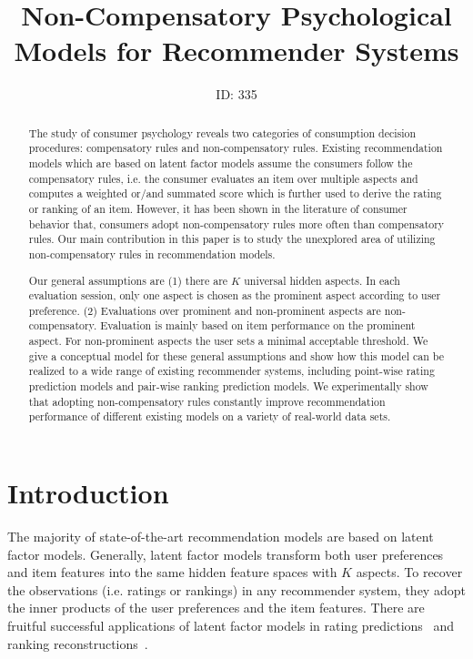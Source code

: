 \documentclass[letterpaper]{article} %
\begin{document}
%
\title{Non-Compensatory Psychological Models for Recommender Systems}
\author{ID: 335
}
\maketitle
\begin{abstract}
The study of consumer psychology reveals two categories of consumption decision procedures: compensatory rules and non-compensatory rules. Existing recommendation models which are based on latent factor models assume the consumers follow the compensatory rules, i.e. the consumer evaluates an item over multiple aspects and computes a weighted or/and summated score which is further used to derive the rating or ranking of an item. However, it has been shown in the literature of consumer behavior that, consumers adopt non-compensatory rules more often than compensatory rules. Our main contribution in this paper is to study the unexplored area of utilizing non-compensatory rules in recommendation models. 

Our general assumptions are (1) there are $K$ universal hidden aspects. In each evaluation session, only one aspect is chosen as the prominent aspect according to user preference. (2) Evaluations over prominent and non-prominent aspects are non-compensatory. Evaluation is mainly based on item performance on the prominent aspect. For non-prominent aspects the user sets a minimal acceptable threshold. We give a conceptual model for these general assumptions and show how this model can be realized to a wide range of existing recommender systems, including  point-wise rating prediction models and pair-wise ranking prediction models.  We experimentally show that adopting non-compensatory rules constantly improve recommendation performance of different existing models on a variety of real-world data sets.
\end{abstract}



\section{Introduction}\label{sec:introduction}
The majority of state-of-the-art recommendation models are based on latent factor models. Generally, latent factor models transform both user preferences and item features into the same hidden feature spaces with $K$ aspects. To recover the observations (i.e. ratings or rankings) in any recommender system, they adopt the inner products of the user preferences and the item features. There are fruitful successful applications of latent factor models in  rating predictions~\cite{Koren2009Matrix,Koren2010Factor,Lee2014Local} and ranking reconstructions~\cite{Rendle2009BPR,Steck2015Gaussian,Zhao2018Factored,Shi2010List}.   
\end{document}
